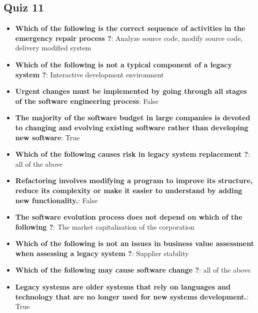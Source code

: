 \documentclass{report}
\begin{document}
    \subsection{Quiz 11}
    \begin{itemize}
        \item \textbf{Which of the following is the correct sequence of activities in the emergency repair process ?}: Analyze source code, modify source code, delivery modified system
        \item \textbf{Which of the following is not a typical component of a legacy system ?}: Interactive development environment
        \item \textbf{Urgent changes must be implemented by going through all stages of the software engineering process}: False
        \item \textbf{The majority of the software budget in large companies is devoted to changing and evolving existing software rather than developing new software}: True
        \item \textbf{Which of the following causes risk in legacy system replacement ?}: all of the above
        \item \textbf{Refactoring involves modifying a program to improve its structure, reduce its complexity or make it easier to understand by adding new functionality.}: False
        \item \textbf{The software evolution process does not depend on which of the following ?}: The market capitalization of the corporation
        \item \textbf{Which of the following is not an issues in business value assessment when assessing a legacy system ?}: Supplier stability
        \item \textbf{Which of the following may cause software change ?}: all of the above
        \item \textbf{Legacy systems are older systems that rely on languages and technology that are no longer used for new systems development.}: True
    \end{itemize}
    
\end{document}
